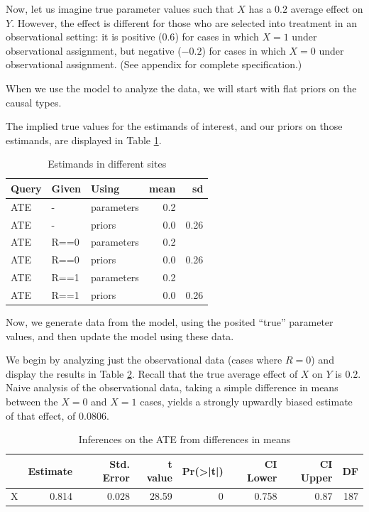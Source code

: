 \documentclass[
  12pt,
]{book}
\begin{document}
Now, let us imagine true parameter values such that \(X\) has a \(0.2\) average effect on \(Y\). However, the effect is different for those who are selected into treatment in an observational setting: it is positive (\(0.6\)) for cases in which \(X=1\) under observational assignment, but negative (\(-0.2\)) for cases in which \(X=0\) under observational assignment. (See appendix for complete specification.)

When we use the model to analyze the data, we will start with flat priors on the causal types.

The implied true values for the estimands of interest, and our priors on those estimands, are displayed in Table \ref{tab:fusionestimands}.

\begin{table}

\caption{\label{tab:fusionestimands}Estimands in different sites}
\centering
\begin{tabular}[t]{l|l|l|r|r}
\hline
Query & Given & Using & mean & sd\\
\hline
ATE & - & parameters & 0.2 & \\
\hline
ATE & - & priors & 0.0 & 0.26\\
\hline
ATE & R==0 & parameters & 0.2 & \\
\hline
ATE & R==0 & priors & 0.0 & 0.26\\
\hline
ATE & R==1 & parameters & 0.2 & \\
\hline
ATE & R==1 & priors & 0.0 & 0.26\\
\hline
\end{tabular}
\end{table}

Now, we generate data from the model, using the posited ``true'' parameter values, and then update the model using these data.

We begin by analyzing just the observational data (cases where \(R=0\)) and display the results in Table \ref{tab:fusiondim}. Recall that the true average effect of \(X\) on \(Y\) is \(0.2\). Naive analysis of the observational data, taking a simple difference in means between the \(X=0\) and \(X=1\) cases, yields a strongly upwardly biased estimate of that effect, of 0.0806.

\begin{table}

\caption{\label{tab:fusiondim}Inferences on the ATE from differences in means}
\centering
\begin{tabular}[t]{l|r|r|r|r|r|r|r}
\hline
  & Estimate & Std. Error & t value & Pr(>|t|) & CI Lower & CI Upper & DF\\
\hline
X & 0.814 & 0.028 & 28.59 & 0 & 0.758 & 0.87 & 187\\
\hline
\end{tabular}
\end{table}
\end{document}
